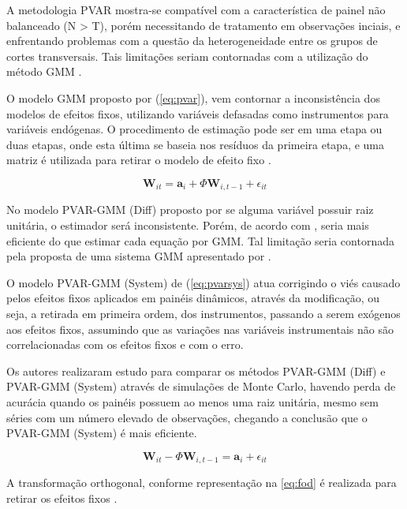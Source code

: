 \documentclass[
  12pt,
  12pt,
  openright,
  oneside,
  a4paper,
  chapter=TITLE,
  section=TITLE,
  subsection=TITLE,
  subsubsection=TITLE,
  english,
  portugues,
  sumario=tradicional]{abntex2}
\begin{document}
A metodologia PVAR mostra-se compatível com a característica de painel não balanceado (N \textgreater{} T), porém necessitando de tratamento em observações inciais, e enfrentando problemas com a questão da heterogeneidade entre os grupos de cortes transversais. Tais limitações seriam contornadas com a utilização do método GMM \cite{holtz-eakin:1988}.

O modelo GMM proposto por \textcite{arellanobond:1991} (\autoref{eq:pvar}), vem contornar a inconsistência dos modelos de efeitos fixos, utilizando variáveis defasadas como instrumentos para variáveis endógenas. O procedimento de estimação pode ser em uma etapa ou duas etapas, onde esta última se baseia nos resíduos da primeira etapa, e uma matriz é utilizada para retirar o modelo de efeito fixo \cite{sigmund:2008}.

\begin{equation}\label{eq:pvar}
\mathbf{W}_{it} = \mathbf{a}_{i} + \Phi \mathbf{W}_{i, t-1} + \epsilon_{it}  
\end{equation}

No modelo PVAR-GMM (Diff) proposto por \textcite{arellanobond:1991} se alguma variável possuir raiz unitária, o estimador será inconsistente. Porém, de acordo com \textcite{binder:2005}, seria mais eficiente do que estimar cada equação por GMM. Tal limitação seria contornada pela proposta de uma sistema GMM apresentado por \textcite{blundelbond:1998}.

O modelo PVAR-GMM (System) de \textcite{blundelbond:1998} (\autoref{eq:pvarsys}) atua corrigindo o viés causado pelos efeitos fixos aplicados em painéis dinâmicos, através da modificação, ou seja, a retirada em primeira ordem, dos instrumentos, passando a serem exógenos aos efeitos fixos, assumindo que as variações nas variáveis instrumentais não são correlacionadas com os efeitos fixos e com o erro.

Os autores \textcite{binder:2005} realizaram estudo para comparar os métodos PVAR-GMM (Diff) e PVAR-GMM (System) através de simulações de Monte Carlo, havendo perda de acurácia quando os painéis possuem ao menos uma raiz unitária, mesmo sem séries com um número elevado de observações, chegando a conclusão que o PVAR-GMM (System) é mais eficiente.

\begin{equation}\label{eq:pvarsys}
\mathbf{W}_{it} - \Phi\mathbf{W}_{i, t-1} = \mathbf{a}_{i} + \epsilon_{it}  
\end{equation}

A transformação orthogonal, conforme representação na \autoref{eq:fod} é realizada para retirar os efeitos fixos \cite{sigmund:2008}.
\end{document}
